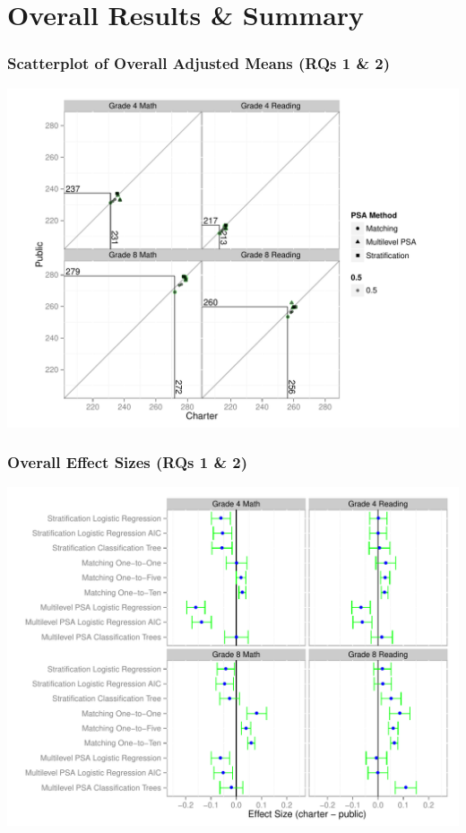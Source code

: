 \documentclass[10pt,handout,mathserif]{beamer}
\begin{document}
\section{Overall Results \& Summary}

\begin{frame}[c]
	\frametitle{Scatterplot of Overall Adjusted Means (RQs 1 \& 2)}
	\begin{center}
	\includegraphics[width=0.85\paperwidth,keepaspectratio]{../Figures2009/OverallScatter}
	\end{center}
\end{frame}

\begin{frame}[c]
	\frametitle{Overall Effect Sizes (RQs 1 \& 2)}
	\begin{center}
	\includegraphics[width=0.85\paperwidth,keepaspectratio]{../Figures2009/Overall}
	\end{center}
\end{frame}
\end{document}
